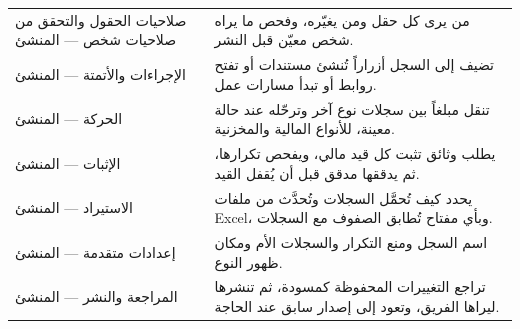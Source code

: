 \begin{table}[H]
\begin{tabularx}{\linewidth}{R{4.2cm} Y}
صلاحيات الحقول والتحقق من صلاحيات شخص — المنشئ & من يرى كل حقل ومن يغيّره، وفحص ما يراه شخص معيّن قبل النشر.\\
الإجراءات والأتمتة — المنشئ & تضيف إلى السجل أزراراً تُنشئ مستندات أو تفتح روابط أو تبدأ مسارات عمل.\\
الحركة — المنشئ & تنقل مبلغاً بين سجلات نوع آخر وترحّله عند حالة معينة، للأنواع المالية والمخزنية.\\
الإثبات — المنشئ & يطلب وثائق تثبت كل قيد مالي، ويفحص تكرارها، ثم يدققها مدقق قبل أن يُقفل القيد.\\
الاستيراد — المنشئ & يحدد كيف تُحمَّل السجلات وتُحدَّث من ملفات Excel، وبأي مفتاح تُطابق الصفوف مع السجلات.\\
إعدادات متقدمة — المنشئ & اسم السجل ومنع التكرار والسجلات الأم ومكان ظهور النوع.\\
المراجعة والنشر — المنشئ & تراجع التغييرات المحفوظة كمسودة، ثم تنشرها ليراها الفريق، وتعود إلى إصدار سابق عند الحاجة.\\
\end{tabularx}
\end{table}
